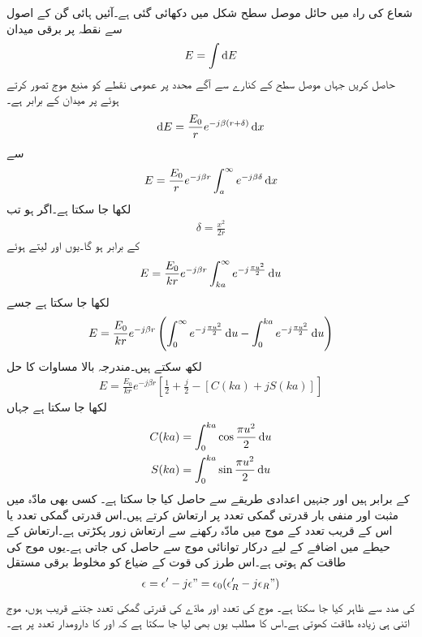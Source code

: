 شعاع کی راہ میں حائل موصل سطح شکل میں دکھائی گئی ہے۔آئیں ہائی گن کے اصول سے نقطہ  پر برقی میدان 
\begin{align}
E=\int \dif E
\end{align}
حاصل کریں جہاں موصل سطح کے کنارے سے آگے  محدد پر عمومی نقطے کو منبع موج تصور کرتے ہوئے  پر میدان  کے برابر ہے۔
\begin{align}
\dif E=\frac{E_0}{r} e^{-j \beta (r+\delta)} \dif x
\end{align}
سے
\begin{align}
E=\frac{E_0}{r} e^{-j \beta r} \int_a^{\infty} e^{-j \beta \delta} \dif x
\end{align}
لکھا جا سکتا ہے۔اگر  ہو تب
\begin{align}
\delta=\frac{x^2}{2r}
\end{align}
کے برابر ہو گا۔یوں  اور  لیتے ہوئے
\begin{align}
E=\frac{E_0}{k r} e^{-j \beta r} \int_{k a}^{\infty} e^{-j \frac{\pi u^2}{2}} \dif u
\end{align}
لکھا جا سکتا ہے جسے
\begin{align}
E=\frac{E_0}{k r} e^{-j \beta r} \left(\int_0^{\infty} e^{-j \frac{\pi u^2}{2}} \dif u-\int_0^{k a} e^{-j \frac{\pi u^2}{2}} \dif u \right)
\end{align}
لکھ سکتے ہیں۔مندرجہ بالا مساوات کا حل
\begin{align}
E=\frac{E_0}{k r} e^{-j \beta r} \left[\frac{1}{2}+\frac{j}{2}-\left[C(ka)+jS(ka)\right]\right]
\end{align}
لکھا جا سکتا ہے جہاں
\begin{align}
C(ka)&=\int_{0}^{k a} \cos \frac{\pi u^2}{2} \dif u\\
S(ka)&=\int_{0}^{k a} \sin \frac{\pi u^2}{2} \dif u 
\end{align}
کے برابر ہیں اور جنہیں اعدادی طریقے سے حاصل کیا جا سکتا ہے۔
کسی بھی مادّہ میں مثبت اور منفی بار قدرتی گمکی تعدد پر ارتعاش کرتے ہیں۔اس قدرتی گمکی تعدد یا اس کے قریب تعدد کے موج میں مادّہ رکھنے سے ارتعاش زور پکڑتی ہے۔ارتعاش کے حیطے میں اضافے کے لیے درکار توانائی موج سے حاصل کی جاتی ہے۔یوں موج کی طاقت کم ہوتی ہے۔اس طرز کی قوت کے ضیاع کو مخلوط برقی مستقل
\begin{align}
\epsilon=\epsilon'-j \epsilon"=\epsilon_0(\epsilon_R'-j\epsilon_R")
\end{align}
 کی مدد سے ظاہر کیا جا سکتا ہے۔ موج کی تعدد اور مادّے کی قدرتی گمکی تعدد جتنے قریب ہوں، موج اتنی ہی زیادہ طاقت کھوتی ہے۔اس کا مطلب یوں بھی لیا جا سکتا ہے کہ  اور  کا دارومدار تعدد پر ہے۔

